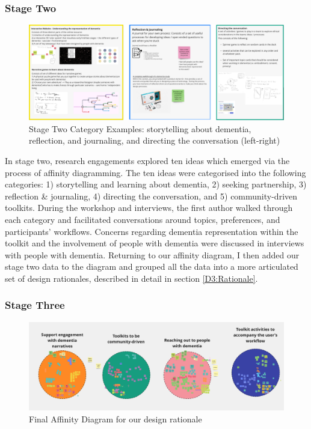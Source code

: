 \subsubsection{Stage Two}
\begin{figure}[h]
\centering
\includegraphics[width=1\linewidth]{Images/D3Toolkit/Fig2.png}
\caption{Stage Two Category Examples: storytelling about dementia, reflection, and journaling, and directing the conversation (left-right)}
\label{fig:StageTwoDesigns}
\end{figure}
In stage two, research engagements explored ten ideas which emerged via the process of affinity diagramming. The ten ideas were categorised into the following categories: 1) storytelling and learning about dementia, 2) seeking partnership, 3) reflection \& journaling, 4) directing the conversation, and 5) community-driven toolkits. During the workshop and interviews, the first author walked through each category and facilitated conversations around topics, preferences, and participants’ workflows. Concerns regarding dementia representation within the toolkit and the involvement of people with dementia were discussed in interviews with people with dementia. Returning to our affinity diagram, I then added our stage two data to the diagram and grouped all the data into a more articulated set of design rationales, described in detail in section \ref{D3:Rationale}.


\subsubsection{Stage Three}
\begin{figure}[h]
\centering
\includegraphics[width=1\linewidth]{Images/D3Toolkit/Fig3.png}
\caption{Final Affinity Diagram for our design rationale}
\label{fig:AffinityDiagram}
\end{figure}

